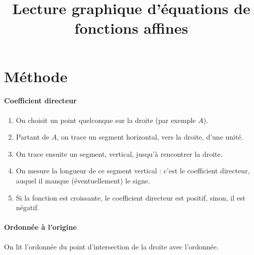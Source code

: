 \documentclass[12pt]{article}
\title{Lecture graphique d'équations de fonctions affines}
\date{}
\begin{document}
\maketitle

\section{Méthode}

\begin{center}
\end{center}

  \paragraph{Coefficient directeur}
  \begin{enumerate}
    \item On choisit un point quelconque sur la droite (par exemple $A$).
    \item Partant de $A$, on trace un segment horizontal, vers la droite, d'une unité.
    \item On trace ensuite un segment, vertical, jusqu'à rencontrer la droite.
    \item On mesure la longueur de ce segment vertical : c'est le coefficient directeur, auquel il manque (éventuellement) le signe.
    \item Si la fonction est croissante, le coefficient directeur est positif, sinon, il est négatif.
  \end{enumerate}

  \paragraph{Ordonnée à l'origine}
  On lit l'ordonnée du point d'intersection de la droite avec l'ordonnée.
\end{document}

